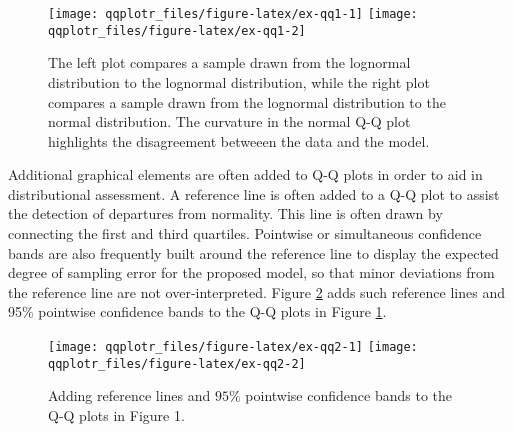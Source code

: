 \begin{Schunk}
\begin{figure}

{\centering \texttt{[image: qqplotr\_files/figure-latex/ex-qq1-1]} \texttt{[image: qqplotr\_files/figure-latex/ex-qq1-2]} 

}

\caption[The left plot compares a sample drawn from the lognormal distribution to the lognormal distribution, while the right plot compares a sample drawn from the lognormal distribution to the normal distribution]{The left plot compares a sample drawn from the lognormal distribution to the lognormal distribution, while the right plot compares a sample drawn from the lognormal distribution to the normal distribution. The curvature in the normal Q-Q plot highlights the disagreement betweeen the data and the model.}\label{fig:ex-qq1}
\end{figure}
\end{Schunk}

Additional graphical elements are often added to Q-Q plots in order to
aid in distributional assessment. A reference line is often added to a
Q-Q plot to assist the detection of departures from normality. This line
is often drawn by connecting the first and third quartiles. Pointwise or
simultaneous confidence bands are also frequently built around the
reference line to display the expected degree of sampling error for the
proposed model, so that minor deviations from the reference line are not
over-interpreted. Figure \ref{fig:ex-qq2} adds such reference lines and
95\% pointwise confidence bands to the Q-Q plots in Figure
\ref{fig:ex-qq1}.

\begin{Schunk}
\begin{figure}

{\centering \texttt{[image: qqplotr\_files/figure-latex/ex-qq2-1]} \texttt{[image: qqplotr\_files/figure-latex/ex-qq2-2]} 

}

\caption[Adding reference lines and $95\%$ pointwise confidence bands to the Q-Q plots in Figure 1]{Adding reference lines and $95\%$ pointwise confidence bands to the Q-Q plots in Figure 1.}\label{fig:ex-qq2}
\end{figure}
\end{Schunk}

